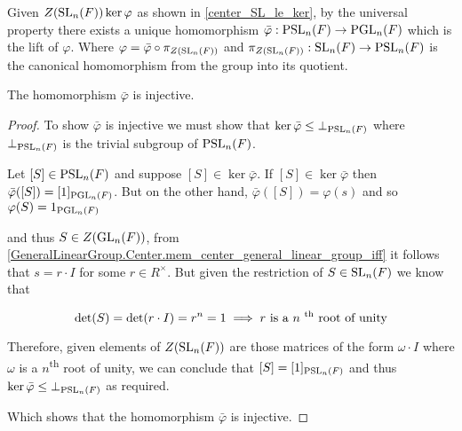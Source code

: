 \begin{definition}
\label{PSL_monoidHom_PGL}
\leanok
    Given $Z(\operatorname{SL}_n(F)) \ker \varphi$ as shown in \ref{center_SL_le_ker}, by the universal property there exists a unique homomorphism $\bar{\varphi} : \operatorname{PSL}_n(F) \rightarrow \operatorname{PGL}_n(F)$ which is the lift of $\varphi$. 
    Where $\varphi = \bar{\varphi} \circ \pi_{Z(\operatorname{SL}_n(F))}$ and $\pi_{Z(\operatorname{SL}_n(F))} : \operatorname{SL}_n(F) \rightarrow \operatorname{PSL}_n(F)$ is the canonical homomorphism from the group into its quotient.
\end{definition}



\begin{lemma}
\label{Injective_PSL_monoidHom_PGL}
\leanok
    The homomorphism $\bar{\varphi}$ is injective.
\end{lemma}

\begin{proof}

To show $\bar{\varphi}$ is injective we must show that $\ker \bar{\varphi} \leq \bot_{\operatorname{PSL}_n(F)}$ where $\bot_{\operatorname{PSL}_n(F)}$ is the trivial subgroup of $\operatorname{PSL}_n(F)$.

Let $[S] \in \operatorname{PSL}_n(F)$ and suppose $[S] \in \ker \bar{\varphi}$. If $[S] \in \ker \bar{\varphi}$ then $\bar{\varphi} ([S]) = [1]_{\operatorname{PGL}_n(F)}$. But on the other hand, $\bar{\varphi} ([S]) = \varphi(s)$ and so $\varphi(S) = 1_{\operatorname{PGL}_n(F)}$

and thus $S \in Z(\operatorname{GL}_n(F))$, from \ref{GeneralLinearGroup.Center.mem_center_general_linear_group_iff} it follows that $s = r \cdot I$ for some $r \in R^\times$. But given the restriction of $S \in \operatorname{SL}_n(F)$ we know that 

\begin{equation*}
    \det(S) = \det(r \cdot I) = r^n = 1 \implies \text{$r$ is a $n$ \textsuperscript{th} root of unity}
\end{equation*}

Therefore, given elements of $Z(\operatorname{SL}_n(F))$ are those matrices of the form $\omega \cdot I$ where $\omega$ is a $n$\textsuperscript{th} root of unity, we can conclude that $[S] = [1]_{\operatorname{PSL}_n(F)}$ and thus $\ker \bar{\varphi} \leq \bot_{\operatorname{PSL}_n(F)}$ as required.

Which shows that the homomorphism $\bar{\varphi}$ is injective.
\end{proof}

